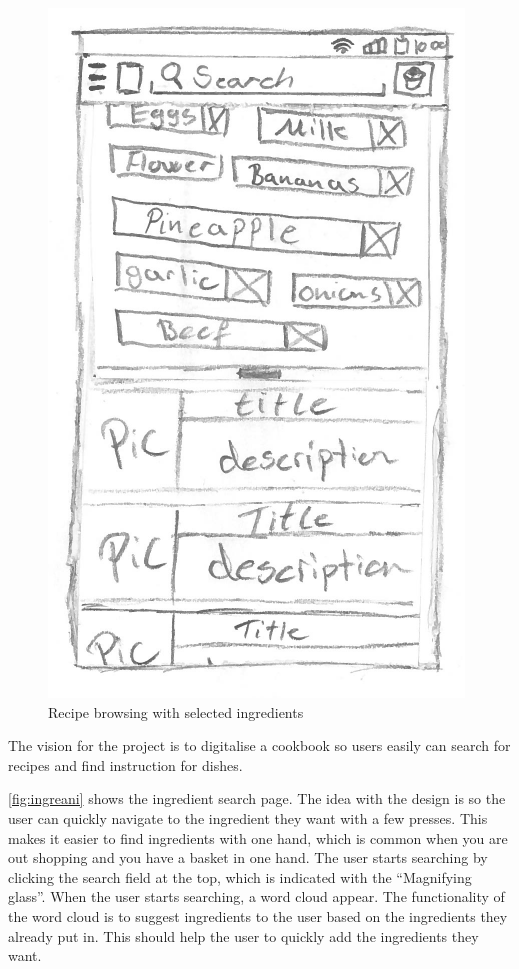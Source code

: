 \begin{figure}[H]
\begin{minipage}[b]{0.5\columnwidth}
\includegraphics[width=0.72\columnwidth]{../img/prototypes/recipe_browse2.pdf}
\caption{Recipe browsing with selected ingredients \label{fig:recipeword}}
\end{minipage}
\end{figure}

The vision for the project is to digitalise a cookbook so users easily can search for recipes and find instruction for dishes. 

\autoref{fig:ingreani} shows the ingredient search page. The idea with the design is so the user can quickly navigate to the ingredient they want with a few presses. This makes it easier to find ingredients with one hand, which is common when you are out shopping and you have a basket in one hand. The user starts searching by clicking the search field at the top, which is indicated with the ``Magnifying glass''. When the user starts searching, a word cloud appear. The functionality of the word cloud is to suggest ingredients to the user based on the ingredients they already put in. This should help the user to quickly add the ingredients they want. 

